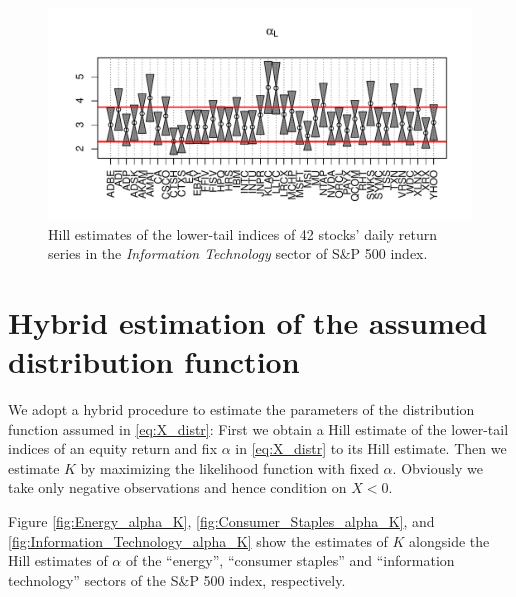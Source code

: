 \documentclass{article}
\newcommand{\1}[1]{
  \mathbf{1}_{\{#1\}}
}
\begin{document}
\begin{figure}[htb!]
  \centering
  \includegraphics[width=\textwidth]{Information_Technology_lower.pdf}
  \caption{Hill estimates of the lower-tail indices of 42 stocks' daily
    return series in the {\it Information Technology} sector of S\&P
    500 index.
  }
  \label{fig:Information_Technology_lower}
\end{figure}

\section{Hybrid estimation of the assumed distribution function}
\label{sec:hybrid_estimation}
We adopt a hybrid procedure to estimate the parameters of the
distribution function assumed in \eqref{eq:X_distr}: First we
obtain a Hill estimate of the lower-tail indices of an
equity return and fix $\alpha$ in \eqref{eq:X_distr}
to its Hill estimate. Then we estimate $K$ by maximizing
the likelihood function with fixed $\alpha$. Obviously we take only
negative observations and hence condition on $X < 0$.

Figure \ref{fig:Energy_alpha_K},
\ref{fig:Consumer_Staples_alpha_K},
and \ref{fig:Information_Technology_alpha_K}
show the estimates of $K$ alongside the Hill estimates of $\alpha$ of
the ``energy'', ``consumer staples'' and ``information
technology'' sectors of the S\&P 500 index, respectively.
\end{document}
